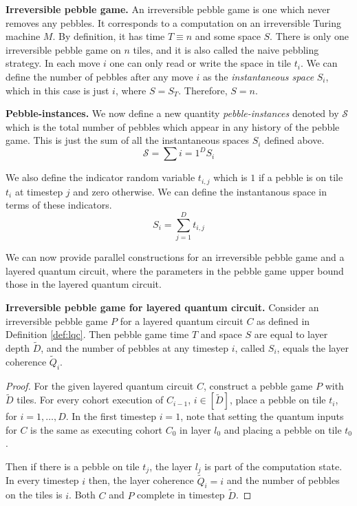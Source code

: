 \begin{definition}{\textbf{Irreversible pebble game.}}
An irreversible pebble game is one which never removes any pebbles.
It corresponds to a computation on an irreversible Turing machine $M$.
By definition, it has time $T \equiv n$ and some space $S$.
There is only one irreversible pebble game on $n$ tiles, and it is also called
the naive pebbling strategy.
In each move $i$ one can only
read or write the space in tile $t_i$.
We can define the number of pebbles after any move $i$ as the \emph{instantaneous space}
$S_i$, which in this case is just $i$, where $S = S_T$.
Therefore, $S = n$.
\end{definition}

\begin{definition}{\textbf{Pebble-instances.}}
We now define a new quantity \emph{pebble-instances} denoted by
$\mathcal{S}$ which is the total number of pebbles which appear in
any history of the pebble game. This is just the sum of all the
instantaneous spaces $S_i$ defined above.
\begin{equation}
\mathcal{S} = \sum{i=1}^D S_i
\end{equation}

We also define the indicator random variable $t_{i,j}$ which is $1$
if a pebble is on tile $t_i$ at timestep $j$ and zero otherwise.
We can define the instantanous space in terms of these indicators.
\begin{equation}
S_i = \sum_{j=1}^D t_{i,j}
\end{equation}
\end{definition}

We can now provide parallel constructions for an irreversible pebble game
and a layered quantum circuit, where the parameters in the pebble game
upper bound those in the layered quantum circuit.

\begin{theorem}{\textbf{Irreversible pebble game for layered quantum circuit.}}
Consider an irreversible pebble game $P$ for a layered quantum circuit $C$
as defined in 
Definition \ref{def:lqc}. Then pebble game time $T$ and space $S$ are equal to layer depth $\tilde{D}$,
and the number of pebbles at any timestep $i$, called $S_i$, equals the
layer coherence $\tilde{Q}_i$.
\label{thm:ipg-lqc}
\end{theorem}

\begin{proof}
For the given layered quantum circuit $C$, construct a pebble game $P$
with $\tilde{D}$ tiles. For every cohort execution of $C_{i-1}$, $i \in [\tilde{D}]$,
place a pebble on tile $t_i$, for $i = 1, \ldots, D$.
In the first timestep $i=1$, note that setting the quantum inputs for $C$
is the same as executing cohort $C_0$ in layer $l_0$ and 
placing a pebble on tile $t_0$.

Then if there is a pebble on tile $t_j$,
the layer $l_j$ is part of the computation state. In every timestep $i$ then, the layer coherence
$\tilde{Q}_i = i$ and the number of pebbles on the tiles is $i$.
Both $C$ and $P$ complete in timestep $\tilde{D}$.
\end{proof}

